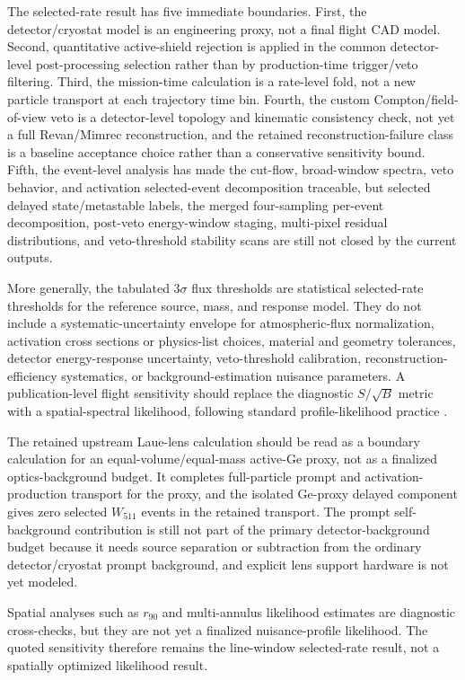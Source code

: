 \documentclass[11pt]{article}
\newcommand{\wii}{W_{511}}
\newcommand{\rewritten}[1]{{\color{green!45!black}#1}}
\begin{document}
\rewritten{The selected-rate result has five immediate boundaries. First, the detector/cryostat model is an engineering proxy, not a final flight CAD model. Second, quantitative active-shield rejection is applied in the common detector-level post-processing selection rather than by production-time trigger/veto filtering. Third, the mission-time calculation is a rate-level fold, not a new particle transport at each trajectory time bin. Fourth, the custom Compton/field-of-view veto is a detector-level topology and kinematic consistency check, not yet a full Revan/Mimrec reconstruction, and the retained reconstruction-failure class is a baseline acceptance choice rather than a conservative sensitivity bound. Fifth, the event-level analysis has made the cut-flow, broad-window spectra, veto behavior, and activation selected-event decomposition traceable, but selected delayed state/metastable labels, the merged four-sampling per-event decomposition, post-veto energy-window staging, multi-pixel residual distributions, and veto-threshold stability scans are still not closed by the current outputs.}

More generally, the tabulated $3\sigma$ flux thresholds are statistical selected-rate thresholds for the reference source, mass, and response model. They do not include a systematic-uncertainty envelope for atmospheric-flux normalization, activation cross sections or physics-list choices, material and geometry tolerances, detector energy-response uncertainty, veto-threshold calibration, reconstruction-efficiency systematics, or background-estimation nuisance parameters. A publication-level flight sensitivity should replace the diagnostic $S/\sqrt{B}$ metric with a spatial-spectral likelihood, following standard profile-likelihood practice \cite{Cowan2011}.

The retained upstream Laue-lens calculation should be read as a boundary calculation for an equal-volume/equal-mass active-Ge proxy, not as a finalized optics-background budget. It completes full-particle prompt and activation-production transport for the proxy, and the isolated Ge-proxy delayed component gives zero selected $\wii$ events in the retained transport. The prompt self-background contribution is still not part of the primary detector-background budget because it needs source separation or subtraction from the ordinary detector/cryostat prompt background, and explicit lens support hardware is not yet modeled.

Spatial analyses such as $r_{90}$ and multi-annulus likelihood estimates are diagnostic cross-checks, but they are not yet a finalized nuisance-profile likelihood. The quoted sensitivity therefore remains the line-window selected-rate result, not a spatially optimized likelihood result.
\end{document}
